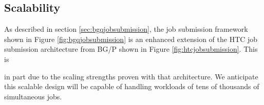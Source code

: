 \subsection{Scalability}
\label{sec:scalability}
As described in section \ref{sec:bgqjobsubmission}, the job submission framework shown in Figure \ref{fig:bgqjobsubmission} 
is an enhanced extension of the HTC job submission architecture from BG/P shown in Figure \ref{fig:htcjobsubmission}. 
This is
\vfill\break

\noindent
in part due to the scaling strengths proven with that architecture. We anticipate 
this scalable design will be capable of handling workloads of tens of thousands of simultaneous jobs.
